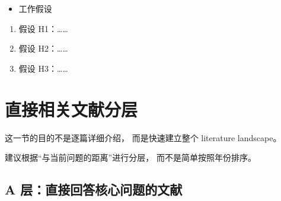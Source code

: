 \documentclass[11pt, oneside]{article}
\begin{document}
\begin{itemize}
    \item 工作假设
\end{itemize}



\begin{enumerate}
	\item 假设 H1：……
	\item 假设 H2：……
	\item 假设 H3：……
\end{enumerate}


\section{直接相关文献分层}

这一节的目的不是逐篇详细介绍，
而是快速建立整个 literature landscape。

建议根据“与当前问题的距离”进行分层，
而不是简单按照年份排序。

\subsection{A 层：直接回答核心问题的文献}
\end{document}

